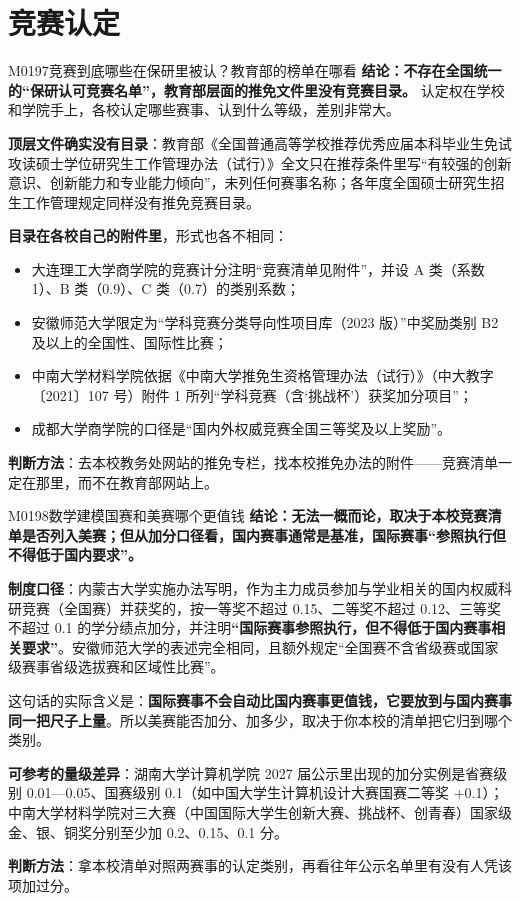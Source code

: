 \section{竞赛认定}
\begin{qa}{M0197}{竞赛到底哪些在保研里被认？教育部的榜单在哪看}
\textbf{结论：不存在全国统一的“保研认可竞赛名单”，教育部层面的推免文件里没有竞赛目录。} 认定权在学校和学院手上，各校认定哪些赛事、认到什么等级，差别非常大。

\textbf{顶层文件确实没有目录}：教育部《全国普通高等学校推荐优秀应届本科毕业生免试攻读硕士学位研究生工作管理办法（试行）》全文只在推荐条件里写“有较强的创新意识、创新能力和专业能力倾向”，未列任何赛事名称；各年度全国硕士研究生招生工作管理规定同样没有推免竞赛目录。

\textbf{目录在各校自己的附件里}，形式也各不相同：
\begin{itemize}
  \item 大连理工大学商学院的竞赛计分注明“竞赛清单见附件”，并设 A 类（系数 1）、B 类（0.9）、C 类（0.7）的类别系数；
  \item 安徽师范大学限定为“学科竞赛分类导向性项目库（2023 版）”中奖励类别 B2 及以上的全国性、国际性比赛；
  \item 中南大学材料学院依据《中南大学推免生资格管理办法（试行）》（中大教字〔2021〕107 号）附件 1 所列“学科竞赛（含‘挑战杯’）获奖加分项目”；
  \item 成都大学商学院的口径是“国内外权威竞赛全国三等奖及以上奖励”。
\end{itemize}

\textbf{判断方法}：去本校教务处网站的推免专栏，找本校推免办法的附件——竞赛清单一定在那里，而不在教育部网站上。
\end{qa}

\begin{qa}{M0198}{数学建模国赛和美赛哪个更值钱}
\textbf{结论：无法一概而论，取决于本校竞赛清单是否列入美赛；但从加分口径看，国内赛事通常是基准，国际赛事“参照执行但不得低于国内要求”。}

\textbf{制度口径}：内蒙古大学实施办法写明，作为主力成员参加与学业相关的国内权威科研竞赛（全国赛）并获奖的，按一等奖不超过 0.15、二等奖不超过 0.12、三等奖不超过 0.1 的学分绩点加分，并注明\textbf{“国际赛事参照执行，但不得低于国内赛事相关要求”}。安徽师范大学的表述完全相同，且额外规定“全国赛不含省级赛或国家级赛事省级选拔赛和区域性比赛”。

这句话的实际含义是：\textbf{国际赛事不会自动比国内赛事更值钱，它要放到与国内赛事同一把尺子上量}。所以美赛能否加分、加多少，取决于你本校的清单把它归到哪个类别。

\textbf{可参考的量级差异}：湖南大学计算机学院 2027 届公示里出现的加分实例是省赛级别 0.01—0.05、国赛级别 0.1（如中国大学生计算机设计大赛国赛二等奖 +0.1）；中南大学材料学院对三大赛（中国国际大学生创新大赛、挑战杯、创青春）国家级金、银、铜奖分别至少加 0.2、0.15、0.1 分。

\textbf{判断方法}：拿本校清单对照两赛事的认定类别，再看往年公示名单里有没有人凭该项加过分。
\end{qa}


